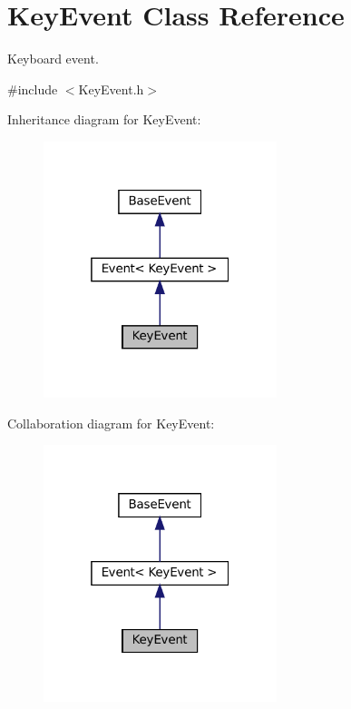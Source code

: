 \hypertarget{classKeyEvent}{}\section{Key\+Event Class Reference}
\label{classKeyEvent}


Keyboard event.  




{\ttfamily \#include $<$Key\+Event.\+h$>$}



Inheritance diagram for Key\+Event\+:\nopagebreak
\begin{figure}[H]
\begin{center}
\leavevmode
\includegraphics[width=193pt]{classKeyEvent__inherit__graph}
\end{center}
\end{figure}


Collaboration diagram for Key\+Event\+:\nopagebreak
\begin{figure}[H]
\begin{center}
\leavevmode
\includegraphics[width=193pt]{classKeyEvent__coll__graph}
\end{center}
\end{figure}

